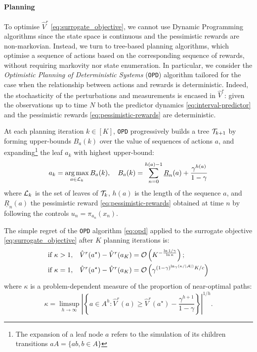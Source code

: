 \paragraph{Planning}
To optimise $\hat{V}^r$ \eqref{eq:surrogate_objective}, we cannot use Dynamic Programming algorithms since the state space is continuous and the pessimistic rewards are non-markovian. Instead, we turn to tree-based planning algorithms, which optimise a sequence of actions based on the corresponding sequence of rewards, without requiring markovity nor state enumeration. In particular, we consider the \emph{Optimistic Planning of Deterministic Systems} (\texttt{OPD}) algorithm \citep{Hren2008} tailored for the case when the relationship between actions and rewards is deterministic. Indeed, the stochasticity of the perturbations and measurements is encased in $\hat{V}^r$: given the observations up to time $N$ both the predictor dynamics \eqref{eq:interval-predictor} and the pessimistic rewards \eqref{eq:pessimistic-rewards} are deterministic.

At each planning iteration $k\in[K]$, \texttt{OPD} progressively builds a tree $\mathcal{T}_{k+1}$ by forming upper-bounds $B_a(k)$ over the value of sequences of actions $a$, and expanding\footnote{The expansion of a leaf node $a$ refers to the simulation of its children transitions $aA = \{ab, b\in A\}$} the leaf $a_k$ with highest upper-bound:
\begin{equation}
\label{eq:opd}
a_k = \operatorname*{arg\,max}_{a\in\mathcal{L}_k} B_a(k), \quad B_a(k) = \sum_{n=0}^{h(a)-1} \underline{R}_n(a) + \frac{\gamma^{h(a)}}{1-\gamma}
\end{equation}
where $\mathcal{L}_k$ is the set of leaves of $\mathcal{T}_k$, $h(a)$ is the length of the sequence $a$, and $\underline{R}_n(a)$ the pessimistic reward \eqref{eq:pessimistic-rewards} obtained at time $n$ by following the controls $u_n = \pi_{a_n}(x_n)$.

\begin{theorem}
	\label{theorem:opd-regret}
	\begin{leftbar}[theorembar]
	The simple regret of the \texttt{OPD} algorithm \eqref{eq:opd} applied to the surrogate objective \eqref{eq:surrogate_objective} after $K$ planning iterations is:
	\begin{align*}
	\text{if } \kappa>1,\quad& 
	\hat{V}^r(a^{\star}) - \hat{V}^r({a_K}) = \mathcal{O}\left(K^{-\frac{\ln 1/\gamma}{\ln \kappa}}\right);\\
	\text{if }\kappa=1,\quad&
	\hat{V}^r(a^{\star}) - \hat{V}^r({a_K}) = \mathcal{O}\left(\gamma^{{(1-\gamma)^{\ln_\gamma (\kappa/|\mathcal{A}|)}}K/{c}}\right)
	\end{align*}
	where $\kappa$ is a problem-dependent measure of the proportion of near-optimal paths:
	\[
	\kappa = \limsup_{h\rightarrow\infty} \left|\left\{a\in A^h: \hat{V}^r(a)\geq \hat{V}^r(a^{\star}) - \frac{\gamma^{h+1}}{1-\gamma}\right\}\right|^{1/h}.
	\]
	\end{leftbar}
\end{theorem}

